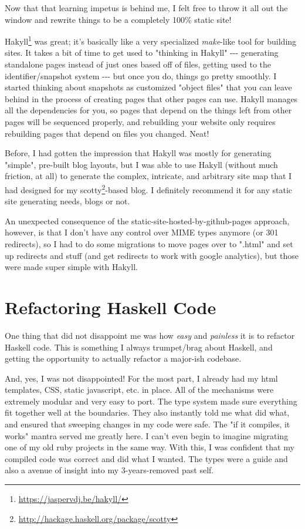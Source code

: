 \documentclass[]{article}
\renewcommand{\href}[2]{#2\footnote{\url{#1}}}
\begin{document}
Now that that learning impetus is behind me, I felt free to throw it all out the
window and rewrite things to be a completely 100\% static site!

\href{https://jaspervdj.be/hakyll/}{Hakyll} was great; it's basically like a
very specialized \emph{make}-like tool for building sites. It takes a bit of
time to get used to "thinking in Hakyll" -\/-\/- generating standalone pages
instead of just ones based off of files, getting used to the identifier/snapshot
system -\/-\/- but once you do, things go pretty smoothly. I started thinking
about snapshots as customized "object files" that you can leave behind in the
process of creating pages that other pages can use. Hakyll manages all the
dependencies for you, so pages that depend on the things left from other pages
will be sequenced properly, and rebuilding your website only requires rebuilding
pages that depend on files you changed. Neat!

Before, I had gotten the impression that Hakyll was mostly for generating
"simple", pre-built blog layouts, but I was able to use Hakyll (without much
friction, at all) to generate the complex, intricate, and arbitrary site map
that I had designed for my
\href{http://hackage.haskell.org/package/scotty}{scotty}-based blog. I
definitely recommend it for any static site generating needs, blogs or not.

An unexpected consequence of the static-site-hosted-by-github-pages approach,
however, is that I don't have any control over MIME types anymore (or 301
redirects), so I had to do some migrations to move pages over to ".html" and set
up redirects and stuff (and get redirects to work with google analytics), but
those were made super simple with Hakyll.

\section{Refactoring Haskell Code}

One thing that did not disappoint me was how \emph{easy} and \emph{painless} it
is to refactor Haskell code. This is something I always trumpet/brag about
Haskell, and getting the opportunity to actually refactor a major-ish codebase.

And, yes, I was not disappointed! For the most part, I already had my html
templates, CSS, static javascript, etc. in place. All of the mechanisms were
extremely modular and very easy to port. The type system made sure everything
fit together well at the boundaries. They also instantly told me what did what,
and ensured that sweeping changes in my code were safe. The "if it compiles, it
works" mantra served me greatly here. I can't even begin to imagine migrating
one of my old ruby projects in the same way. With this, I was confident that my
compiled code was correct and did what I wanted. The types were a guide and also
a avenue of insight into my 3-years-removed past self.
\end{document}

